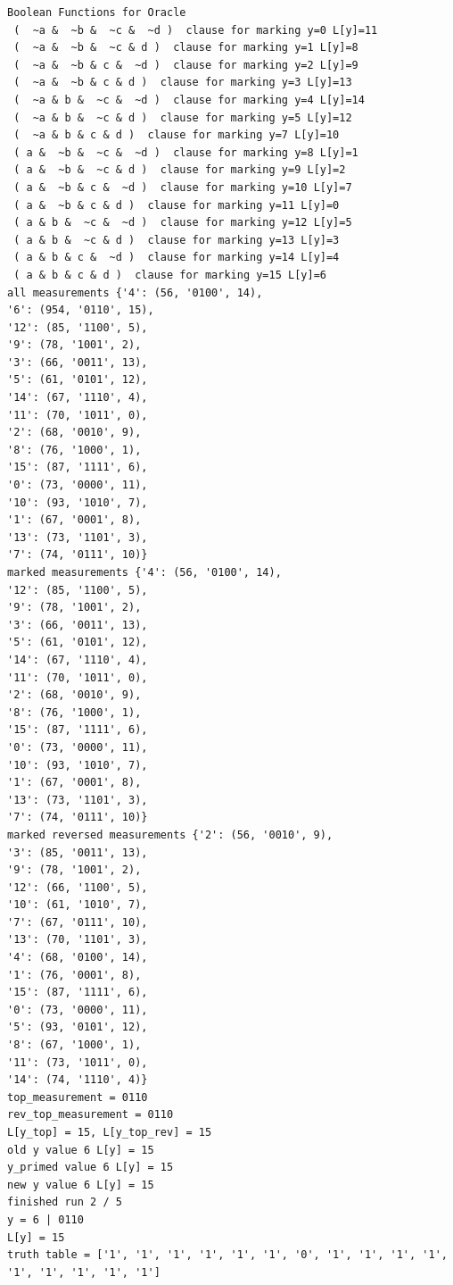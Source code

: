 \documentclass[11pt]{article}
\begin{document}
\begin{verbatim}
Boolean Functions for Oracle
 (  ~a &  ~b &  ~c &  ~d )  clause for marking y=0 L[y]=11
 (  ~a &  ~b &  ~c & d )  clause for marking y=1 L[y]=8
 (  ~a &  ~b & c &  ~d )  clause for marking y=2 L[y]=9
 (  ~a &  ~b & c & d )  clause for marking y=3 L[y]=13
 (  ~a & b &  ~c &  ~d )  clause for marking y=4 L[y]=14
 (  ~a & b &  ~c & d )  clause for marking y=5 L[y]=12
 (  ~a & b & c & d )  clause for marking y=7 L[y]=10
 ( a &  ~b &  ~c &  ~d )  clause for marking y=8 L[y]=1
 ( a &  ~b &  ~c & d )  clause for marking y=9 L[y]=2
 ( a &  ~b & c &  ~d )  clause for marking y=10 L[y]=7
 ( a &  ~b & c & d )  clause for marking y=11 L[y]=0
 ( a & b &  ~c &  ~d )  clause for marking y=12 L[y]=5
 ( a & b &  ~c & d )  clause for marking y=13 L[y]=3
 ( a & b & c &  ~d )  clause for marking y=14 L[y]=4
 ( a & b & c & d )  clause for marking y=15 L[y]=6
all measurements {'4': (56, '0100', 14),
'6': (954, '0110', 15),
'12': (85, '1100', 5),
'9': (78, '1001', 2),
'3': (66, '0011', 13),
'5': (61, '0101', 12),
'14': (67, '1110', 4),
'11': (70, '1011', 0),
'2': (68, '0010', 9),
'8': (76, '1000', 1),
'15': (87, '1111', 6),
'0': (73, '0000', 11),
'10': (93, '1010', 7),
'1': (67, '0001', 8),
'13': (73, '1101', 3),
'7': (74, '0111', 10)}
marked measurements {'4': (56, '0100', 14),
'12': (85, '1100', 5),
'9': (78, '1001', 2),
'3': (66, '0011', 13),
'5': (61, '0101', 12),
'14': (67, '1110', 4),
'11': (70, '1011', 0),
'2': (68, '0010', 9),
'8': (76, '1000', 1),
'15': (87, '1111', 6),
'0': (73, '0000', 11),
'10': (93, '1010', 7),
'1': (67, '0001', 8),
'13': (73, '1101', 3),
'7': (74, '0111', 10)}
marked reversed measurements {'2': (56, '0010', 9),
'3': (85, '0011', 13),
'9': (78, '1001', 2),
'12': (66, '1100', 5),
'10': (61, '1010', 7),
'7': (67, '0111', 10),
'13': (70, '1101', 3),
'4': (68, '0100', 14),
'1': (76, '0001', 8),
'15': (87, '1111', 6),
'0': (73, '0000', 11),
'5': (93, '0101', 12),
'8': (67, '1000', 1),
'11': (73, '1011', 0),
'14': (74, '1110', 4)}
top_measurement = 0110
rev_top_measurement = 0110
L[y_top] = 15, L[y_top_rev] = 15
old y value 6 L[y] = 15
y_primed value 6 L[y] = 15
new y value 6 L[y] = 15
finished run 2 / 5
y = 6 | 0110
L[y] = 15
truth table = ['1', '1', '1', '1', '1', '1', '0', '1', '1', '1', '1', '1', '1', '1', '1', '1']


\end{verbatim}
\end{document}
